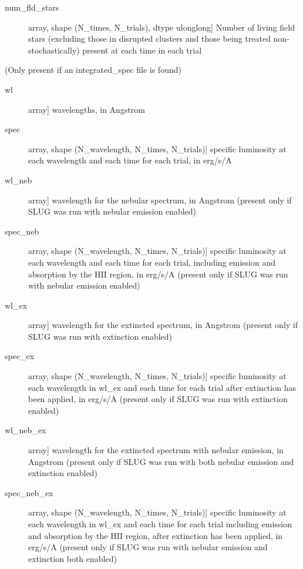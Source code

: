 \documentclass[letterpaper,10pt,english]{sphinxmanual}
\begin{document}
\begin{fulllineitems}
\begin{description}
\begin{description}
\item[{num\_fld\_stars}] \leavevmode{[}array, shape (N\_times, N\_trials), dtype ulonglong{]}
Number of living field stars (excluding those in disrupted 
clusters and those being treated non-stochastically) present at
each time in each trial

\end{description}

(Only present if an integrated\_spec file is found)
\begin{description}
\item[{wl}] \leavevmode{[}array{]}
wavelengths, in Angstrom

\item[{spec}] \leavevmode{[}array, shape (N\_wavelength, N\_times, N\_trials){]}
specific luminosity at each wavelength and each time for each
trial, in erg/s/A

\item[{wl\_neb}] \leavevmode{[}array{]}
wavelength for the nebular spectrum, in Angstrom (present
only if SLUG was run with nebular emission enabled)

\item[{spec\_neb}] \leavevmode{[}array, shape (N\_wavelength, N\_times, N\_trials){]}
specific luminosity at each wavelength and each time for each
trial, including emission and absorption by the HII region,
in erg/s/A (present only if SLUG was run with nebular
emission enabled)

\item[{wl\_ex}] \leavevmode{[}array{]}
wavelength for the extincted spectrum, in Angstrom (present
only if SLUG was run with extinction enabled)

\item[{spec\_ex}] \leavevmode{[}array, shape (N\_wavelength, N\_times, N\_trials){]}
specific luminosity at each wavelength in wl\_ex and each
time for each trial after extinction has been applied, in
erg/s/A (present only if SLUG was run with extinction
enabled)

\item[{wl\_neb\_ex}] \leavevmode{[}array{]}
wavelength for the extincted spectrum with nebular emission,
in Angstrom (present only if SLUG was run with both nebular
emission and extinction enabled)

\item[{spec\_neb\_ex}] \leavevmode{[}array, shape (N\_wavelength, N\_times, N\_trials){]}
specific luminosity at each wavelength in wl\_ex and each
time for each trial including emission and absorption by the
HII region, after extinction has been applied, in erg/s/A
(present only if SLUG was run with nebular emission and
extinction both enabled)


\end{description}
\end{description}
\end{fulllineitems}
\end{document}
